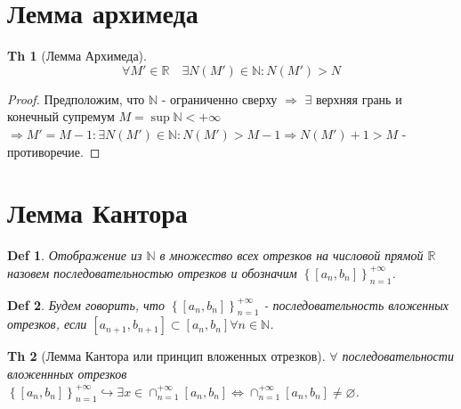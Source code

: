 \documentclass[a5paper, 10pt]{article}
\theoremstyle{plain}
\newtheorem*{theorem}{Th}
\newtheorem{definition}{Def}
\newcommand{\N}{\mathbb N}
\newcommand{\R}{\mathbb R}
\newcommand{\hrarrow}{\hookrightarrow}
\newcommand{\Rarrow}{\Rightarrow}
\newcommand{\Lrarrow}{\Leftrightarrow}
\begin{document}
    \section{Лемма архимеда}

    \begin{theorem}[Лемма Архимеда]
    \[ \forall M' \in \R \quad \exists N(M') \in \N: N(M') > N \]
    \end{theorem}

    \begin{proof}
    Предположим, что $ \N $ - ограниченно сверху $ \Rarrow $ $ \exists $ верхняя грань и конечный
    супремум $ M = \sup \N < + \infty $
    $ \Rarrow M' = M - 1: \exists N(M') \in \N: N(M') > M - 1 \Rarrow
    N(M') + 1 > M $ - противоречие.
    \end{proof}

    \section{Лемма Кантора}

    \begin{definition}
    Отображение из $ \N $ в множество всех отрезков на числовой прямой $ \R $ назовем
    последовательностью отрезков и обозначим
    $ \left\{ \left[ a_n, b_n \right] \right\}_{n=1}^{+\infty} $.
    \end{definition}

    \begin{definition}
    Будем говорить, что
    $ \left\{ \left[ a_n, b_n \right] \right\}_{n=1}^{+\infty} $
    - последовательность вложенных отрезков, если
    $
    \left[ a_{n+1}, b_{n+1} \right]
    \subset
    \left[ a_{n}, b_{n} \right]
    \forall n \in \N
    $.
    \end{definition}

    \begin{theorem}[Лемма Кантора или принцип вложенных отрезков]
        $ \forall $ последовательности вложеннных отрезков
    $
    \left\{ \left[ a_n, b_n \right] \right\}_{n=1}^{+\infty} \hrarrow
    \exists x \in
    \cap_{n=1}^{+\infty}
    \left[ a_{n}, b_{n} \right]
    \Lrarrow
    \cap_{n=1}^{+\infty}
    \left[ a_{n}, b_{n} \right]
    \neq \varnothing
    $.
    \end{theorem}
\end{document}
